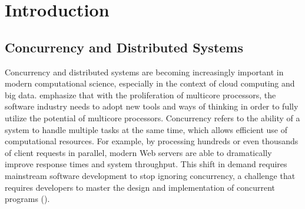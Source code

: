 \documentclass{l4proj}
\begin{document}
%
%
%
%
%
%
%
%
\chapter{Introduction}



\section{Concurrency and Distributed Systems}
Concurrency and distributed systems are becoming increasingly important in modern computational science, especially in the context of cloud computing and big data. \cite{sutter_2005_software} emphasize that with the proliferation of multicore processors, the software industry needs to adopt new tools and ways of thinking in order to fully utilize the potential of multicore processors. Concurrency refers to the ability of a system to handle multiple tasks at the same time, which allows efficient use of computational resources. For example, by processing hundreds or even thousands of client requests in parallel, modern Web servers are able to dramatically improve response times and system throughput. This shift in demand requires mainstream software development to stop ignoring concurrency, a challenge that requires developers to master the design and implementation of concurrent programs (\cite{sutter_2005_software}).
    
\end{document}
